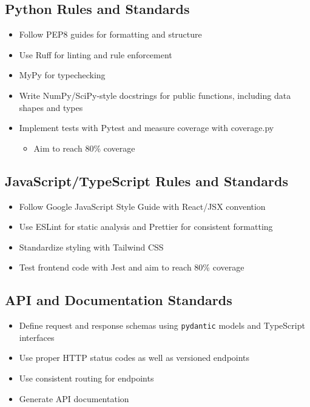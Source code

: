 \documentclass{article}
\begin{document}
\subsection*{Python Rules and Standards}
\begin{itemize}
    \item Follow PEP8 guides for formatting and structure
    \item Use Ruff for linting and rule enforcement
    \item MyPy for typechecking
    \item Write NumPy/SciPy-style docstrings for public functions, including data shapes and types
    \item Implement tests with Pytest and measure coverage with coverage.py
    \begin{itemize}
        \item Aim to reach 80\% coverage
    \end{itemize}
\end{itemize}

\subsection*{JavaScript/TypeScript Rules and Standards}
\begin{itemize}
    \item Follow Google JavaScript Style Guide with React/JSX convention
    \item Use ESLint for static analysis and Prettier for consistent formatting
    \item Standardize styling with Tailwind CSS
    \item Test frontend code with Jest and aim to reach 80\% coverage
\end{itemize}

\subsection*{API and Documentation Standards}
\begin{itemize}
    \item Define request and response schemas using \texttt{pydantic} models and TypeScript interfaces
    \item Use proper HTTP status codes as well as versioned endpoints
    \item Use consistent routing for endpoints
    \item Generate API documentation
\end{itemize}
\end{document}
